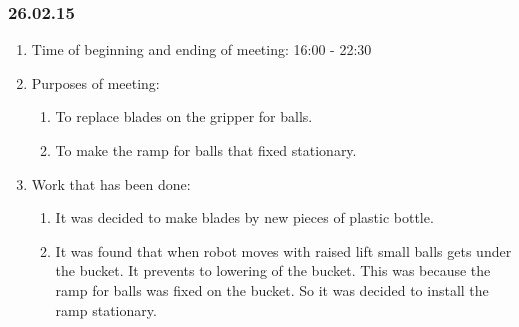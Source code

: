 \subsubsection{26.02.15}

\begin{enumerate}
	\item Time of beginning and ending of meeting:
	16:00 - 22:30
	\item Purposes of meeting:
	\begin{enumerate}
		\item To replace blades on the gripper for balls.
		
		\item To make the ramp for balls that fixed stationary.
	  
    \end{enumerate}
   
	\item Work that has been done:
	\begin{enumerate}
		 
		 \item It was decided to make blades by new pieces of plastic bottle.
		 
		 \item It was found that when robot moves with raised lift small balls gets under the bucket. It prevents to lowering of the bucket. This was because the ramp for balls was fixed on the bucket. So it was decided to install the ramp stationary.
		 

\end{enumerate}
\end{enumerate}
